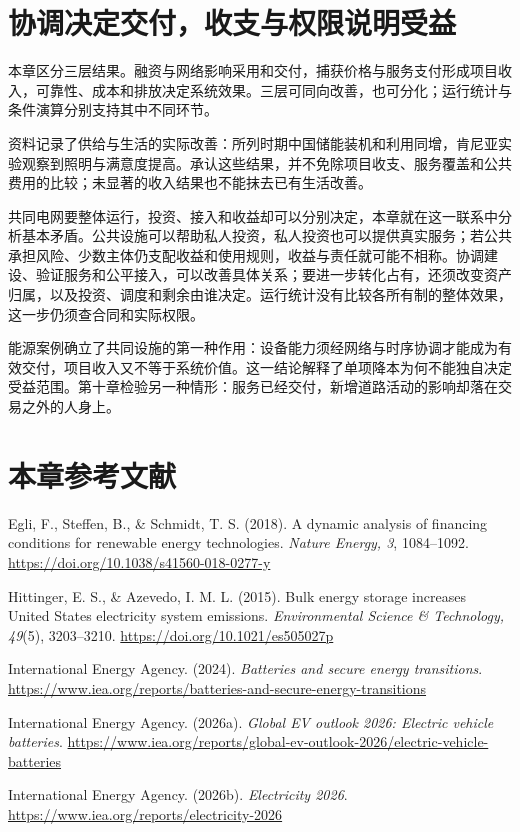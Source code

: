 \documentclass[UTF8,fontset=windows,12pt,a4paper,oneside,openany]{ctexbook}
\begin{document}
\section{协调决定交付，收支与权限说明受益}

本章区分三层结果。融资与网络影响采用和交付，捕获价格与服务支付形成项目收入，可靠性、成本和排放决定系统效果。三层可同向改善，也可分化；运行统计与条件演算分别支持其中不同环节。

资料记录了供给与生活的实际改善：所列时期中国储能装机和利用同增，肯尼亚实验观察到照明与满意度提高。承认这些结果，并不免除项目收支、服务覆盖和公共费用的比较；未显著的收入结果也不能抹去已有生活改善。

共同电网要整体运行，投资、接入和收益却可以分别决定，本章就在这一联系中分析基本矛盾。公共设施可以帮助私人投资，私人投资也可以提供真实服务；若公共承担风险、少数主体仍支配收益和使用规则，收益与责任就可能不相称。协调建设、验证服务和公平接入，可以改善具体关系；要进一步转化占有，还须改变资产归属，以及投资、调度和剩余由谁决定。运行统计没有比较各所有制的整体效果，这一步仍须查合同和实际权限。

能源案例确立了共同设施的第一种作用：设备能力须经网络与时序协调才能成为有效交付，项目收入又不等于系统价值。这一结论解释了单项降本为何不能独自决定受益范围。第十章检验另一种情形：服务已经交付，新增道路活动的影响却落在交易之外的人身上。

\section*{本章参考文献}

Egli, F., Steffen, B., \& Schmidt, T. S. (2018). A dynamic analysis of financing conditions for renewable energy technologies. \emph{Nature Energy, 3}, 1084–1092. \url{https://doi.org/10.1038/s41560-018-0277-y}

Hittinger, E. S., \& Azevedo, I. M. L. (2015). Bulk energy storage increases United States electricity system emissions. \emph{Environmental Science \& Technology, 49}(5), 3203–3210. \url{https://doi.org/10.1021/es505027p}

International Energy Agency. (2024). \emph{Batteries and secure energy transitions}. \url{https://www.iea.org/reports/batteries-and-secure-energy-transitions}

International Energy Agency. (2026a). \emph{Global EV outlook 2026: Electric vehicle batteries}. \url{https://www.iea.org/reports/global-ev-outlook-2026/electric-vehicle-batteries}

International Energy Agency. (2026b). \emph{Electricity 2026}. \url{https://www.iea.org/reports/electricity-2026}
\end{document}
